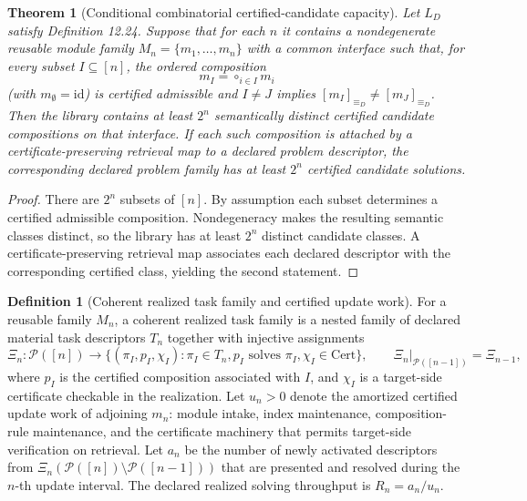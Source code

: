 \documentclass[11pt]{article}
\newtheorem{theorem}{Theorem}
\theoremstyle{definition}
\newtheorem{definition}{Definition}
\begin{document}
\begin{theorem}[Conditional combinatorial certified-candidate capacity]
Let $L_D$ satisfy Definition 12.24. Suppose that for each $n$ it contains a nondegenerate reusable module family $M_n = \{m_1, \dots, m_n\}$ with a common interface such that, for every subset $I \subseteq [n]$, the ordered composition
\begin{equation}
m_I = \mathop{\circ}_{i \in I} m_i \tag{S38}
\end{equation}
(with $m_\emptyset = \mathrm{id}$) is certified admissible and $I \neq J$ implies $[m_I]_{\equiv_D} \neq [m_J]_{\equiv_D}$. Then the library contains at least $2^n$ semantically distinct certified candidate compositions on that interface. If each such composition is attached by a certificate-preserving retrieval map to a declared problem descriptor, the corresponding declared problem family has at least $2^n$ certified candidate solutions.
\end{theorem}

\begin{proof}
There are $2^n$ subsets of $[n]$. By assumption each subset determines a certified admissible composition. Nondegeneracy makes the resulting semantic classes distinct, so the library has at least $2^n$ distinct candidate classes. A certificate-preserving retrieval map associates each declared descriptor with the corresponding certified class, yielding the second statement.
\end{proof}

\begin{definition}[Coherent realized task family and certified update work]
For a reusable family $M_n$, a coherent realized task family is a nested family of declared material task descriptors $T_n$ together with injective assignments
\begin{equation}
\Xi_n : \mathcal{P}([n]) \longrightarrow \{(\pi_I, p_I, \chi_I) : \pi_I \in T_n, p_I \text{ solves } \pi_I, \chi_I \in \mathrm{Cert}\}, \qquad \Xi_n|_{\mathcal{P}([n-1])} = \Xi_{n-1}, \tag{S38a}
\end{equation}
where $p_I$ is the certified composition associated with $I$, and $\chi_I$ is a target-side certificate checkable in the realization. Let $u_n > 0$ denote the amortized certified update work of adjoining $m_n$: module intake, index maintenance, composition-rule maintenance, and the certificate machinery that permits target-side verification on retrieval. Let $a_n$ be the number of newly activated descriptors from $\Xi_n(\mathcal{P}([n]) \setminus \mathcal{P}([n-1]))$ that are presented and resolved during the $n$-th update interval. The declared realized solving throughput is $R_n = a_n / u_n$.
\end{definition}
\end{document}
